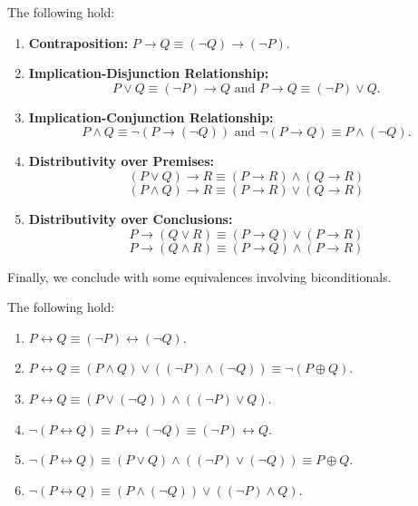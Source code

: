         \begin{theorem}\label{thm:eqlogforms3}
            The following hold:
            \begin{enumerate}
                \item \textbf{Contraposition:} $P \to Q \equiv (\neg Q) \to (\neg P)$.
                \item \textbf{Implication-Disjunction Relationship:} $$P \lor Q \equiv (\neg P) \to Q \text{ and } P \to Q \equiv (\neg P) \lor Q.$$
                \item \textbf{Implication-Conjunction Relationship:} $$P \land Q \equiv \neg\left(P \to (\neg Q)\right) \text{ and } \neg(P \to Q) \equiv P \land (\neg Q).$$
                \item \textbf{Distributivity over Premises:} $$(P \lor Q) \to R \equiv (P \to R) \land (Q \to R)$$ $$(P \land Q) \to R \equiv (P \to R) \lor (Q \to R)$$
                \item \textbf{Distributivity over Conclusions:} $$P \to (Q \lor R) \equiv (P \to Q) \lor (P \to R)$$ $$P \to (Q \land R) \equiv (P \to Q) \land (P \to R)$$
            \end{enumerate}
        \end{theorem}

        Finally, we conclude with some equivalences involving biconditionals.

        \begin{theorem}\label{thm:eqlogforms4}
            The following hold:
            \begin{enumerate}
                \item $P \longleftrightarrow Q \equiv (\neg P) \longleftrightarrow (\neg Q)$.
                \item $P \longleftrightarrow Q \equiv (P \land Q) \lor \left((\neg P) \land (\neg Q)\right) \equiv \neg(P \oplus Q)$.
                \item $P \longleftrightarrow Q \equiv \left(P \lor (\neg Q)\right) \land \left((\neg P) \lor Q\right)$.
                \item $\neg(P \longleftrightarrow Q) \equiv P \longleftrightarrow (\neg Q) \equiv (\neg P) \longleftrightarrow Q$.
                \item $\neg(P \longleftrightarrow Q) \equiv (P \lor Q) \land \left((\neg P) \lor (\neg Q)\right) \equiv P \oplus Q$.
                \item $\neg(P \longleftrightarrow Q) \equiv \left(P \land (\neg Q)\right) \lor \left((\neg P) \land Q\right)$.
            \end{enumerate}
        \end{theorem}
        

